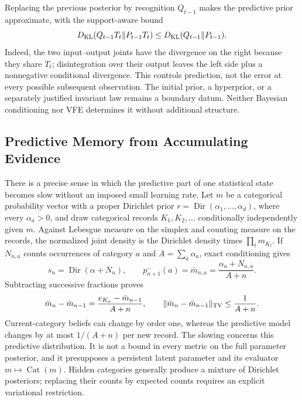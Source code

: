 Replacing the previous posterior by recognition $Q_{t-1}$ makes the predictive prior approximate, with the support-aware bound
\begin{equation}
D_{\rm KL}(Q_{t-1}T_t\Vert P_{t-1}T_t)
\leq D_{\rm KL}(Q_{t-1}\Vert P_{t-1}).
\label{eq:one_law_prediction_error}
\end{equation}
Indeed, the two input--output joints have the divergence on the right because they share $T_t$; disintegration over their output leaves the left side plus a nonnegative conditional divergence. This controls prediction, not the error at every possible subsequent observation. The initial prior, a hyperprior, or a separately justified invariant law remains a boundary datum. Neither Bayesian conditioning nor VFE determines it without additional structure.

\subsection{Predictive Memory from Accumulating Evidence}
\label{sec:accumulating_model_memory}

There is a precise sense in which the predictive part of one statistical state becomes slow without an imposed small learning rate. Let $m$ be a categorical probability vector with a proper Dirichlet prior $r=\operatorname{Dir}(\alpha_1,\ldots,\alpha_d)$, where every $\alpha_a>0$, and draw categorical records $K_1,K_2,\ldots$ conditionally independently given $m$. Against Lebesgue measure on the simplex and counting measure on the records, the normalized joint density is the Dirichlet density times $\prod_t m_{K_t}$. If $N_{n,a}$ counts occurrences of category $a$ and $A=\sum_a\alpha_a$, exact conditioning gives
\begin{equation}
s_n=\operatorname{Dir}(\alpha+N_n),
\qquad
p^-_{n+1}(a)=\bar m_{n,a}=\frac{\alpha_a+N_{n,a}}{A+n}.
\label{eq:accumulation_predictive_model}
\end{equation}
Subtracting successive fractions proves
\begin{equation}
\bar m_n-\bar m_{n-1}=\frac{e_{K_n}-\bar m_{n-1}}{A+n},
\qquad
\|\bar m_n-\bar m_{n-1}\|_{\rm TV}\leq\frac{1}{A+n}.
\label{eq:accumulation_slow_bound}
\end{equation}
Current-category beliefs can change by order one, whereas the predictive model changes by at most $1/(A+n)$ per new record. The slowing concerns this predictive distribution. It is not a bound in every metric on the full parameter posterior, and it presupposes a persistent latent parameter and its evaluator $m\mapsto\operatorname{Cat}(m)$. Hidden categories generally produce a mixture of Dirichlet posteriors; replacing their counts by expected counts requires an explicit variational restriction.

